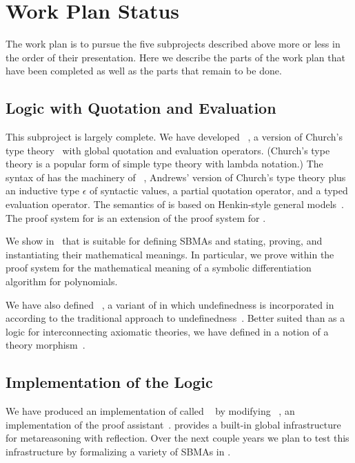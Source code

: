 \documentclass[fleqn]{llncs}
\begin{document}
\ei


\section{Work Plan Status}

The work plan is to pursue the five subprojects described above more
or less in the order of their presentation.  Here we describe the
parts of the work plan that have been completed as well as the parts
that remain to be done.

\subsection*{Logic with Quotation and Evaluation}

This subproject is largely complete.  We have developed
{\churchqe}~\cite{Farmer18}, a version of Church's type
theory~\cite{Church40} with global quotation and evaluation operators.
(Church's type theory is a popular form of simple type theory with
lambda notation.)  The syntax of {\churchqe} has the machinery of
{\qzero}~\cite{Andrews02}, Andrews' version of Church's type theory
plus an inductive type $\epsilon$ of syntactic values, a partial
quotation operator, and a typed evaluation operator.  The semantics of
{\churchqe} is based on Henkin-style general models~\cite{Henkin50}.
The proof system for {\churchqe} is an extension of the proof system
for {\qzero}.

We show in~\cite{Farmer18} that {\churchqe} is suitable for defining
SBMAs and stating, proving, and instantiating their mathematical
meanings.  In particular, we prove within the proof system for
{\churchqe} the mathematical meaning of a symbolic differentiation
algorithm for polynomials.

We have also defined {\churchuqe}~\cite{Farmer17}, a variant of
{\churchqe} in which undefinedness is incorporated in {\churchqe}
according to the traditional approach to
undefinedness~\cite{Farmer04}.  Better suited than {\churchqe} as a
logic for interconnecting axiomatic theories, we have defined in
{\churchuqe} a notion of a theory morphism~\cite{Farmer17}.

\subsection*{Implementation of the Logic}

We have produced an implementation of {\churchqe} called
{\HLQE}~\cite{CaretteFarmerLaskowski18} by modifying
{\HL}~\cite{Harrison09}, an implementation of the {\HOL} proof
assistant~\cite{GordonMelham93}.  {\HLQE} provides a built-in global
infrastructure for metareasoning with reflection.  Over the next
couple years we plan to test this infrastructure by formalizing a
variety of SBMAs in {\HLQE}.
\end{document}
